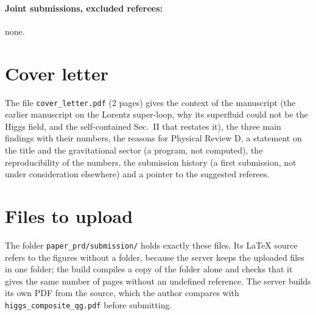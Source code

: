\documentclass[11pt]{article}
\begin{document}
\paragraph{Joint submissions, excluded referees:} none.

\section{Cover letter}

The file \texttt{cover\_letter.pdf} (2 pages) gives the context of the manuscript (the earlier manuscript
on the Lorentz super-loop, why its superfluid could not be the Higgs field, and the self-contained Sec.~II that restates
it), the three main findings with their numbers, the reasons for Physical Review D, a statement on
the title and the gravitational sector (a program, not computed), the reproducibility of the numbers, the submission
history (a first submission, not under consideration elsewhere) and a pointer to the suggested referees.

\section{Files to upload}
\label{sec:files}

The folder \texttt{paper\_prd/submission/} holds exactly these files. Its LaTeX source refers to the figures without a
folder, because the server keeps the uploaded files in one folder; the build compiles a copy of the folder alone and checks
that it gives the same number of pages without an undefined reference. The server builds its own PDF from the source,
which the author compares with \texttt{higgs\_composite\_qg.pdf} before submitting.
\end{document}
